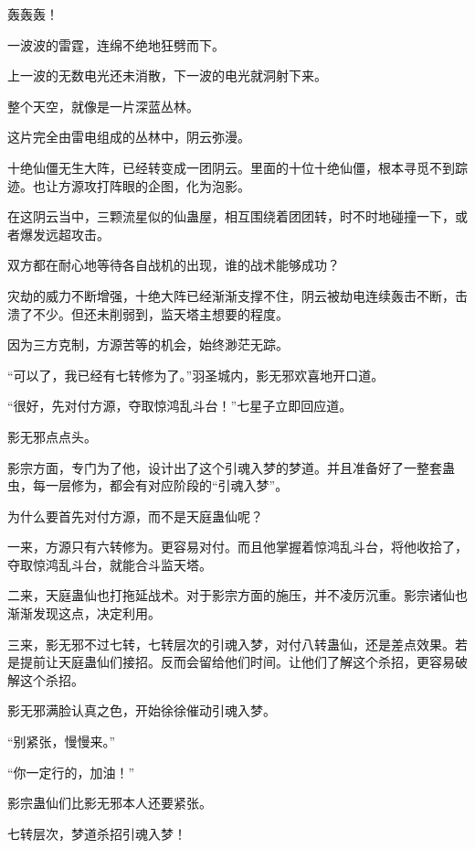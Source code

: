 
\begin{this_body}



轰轰轰！

一波波的雷霆，连绵不绝地狂劈而下。

上一波的无数电光还未消散，下一波的电光就洞射下来。

整个天空，就像是一片深蓝丛林。

这片完全由雷电组成的丛林中，阴云弥漫。

十绝仙僵无生大阵，已经转变成一团阴云。里面的十位十绝仙僵，根本寻觅不到踪迹。也让方源攻打阵眼的企图，化为泡影。

在这阴云当中，三颗流星似的仙蛊屋，相互围绕着团团转，时不时地碰撞一下，或者爆发远超攻击。

双方都在耐心地等待各自战机的出现，谁的战术能够成功？

灾劫的威力不断增强，十绝大阵已经渐渐支撑不住，阴云被劫电连续轰击不断，击溃了不少。但还未削弱到，监天塔主想要的程度。

因为三方克制，方源苦等的机会，始终渺茫无踪。

“可以了，我已经有七转修为了。”羽圣城内，影无邪欢喜地开口道。

“很好，先对付方源，夺取惊鸿乱斗台！”七星子立即回应道。

影无邪点点头。

影宗方面，专门为了他，设计出了这个引魂入梦的梦道。并且准备好了一整套蛊虫，每一层修为，都会有对应阶段的“引魂入梦”。

为什么要首先对付方源，而不是天庭蛊仙呢？

一来，方源只有六转修为。更容易对付。而且他掌握着惊鸿乱斗台，将他收拾了，夺取惊鸿乱斗台，就能合斗监天塔。

二来，天庭蛊仙也打拖延战术。对于影宗方面的施压，并不凌厉沉重。影宗诸仙也渐渐发现这点，决定利用。

三来，影无邪不过七转，七转层次的引魂入梦，对付八转蛊仙，还是差点效果。若是提前让天庭蛊仙们接招。反而会留给他们时间。让他们了解这个杀招，更容易破解这个杀招。

影无邪满脸认真之色，开始徐徐催动引魂入梦。

“别紧张，慢慢来。”

“你一定行的，加油！”

影宗蛊仙们比影无邪本人还要紧张。

七转层次，梦道杀招引魂入梦！


\end{this_body}
